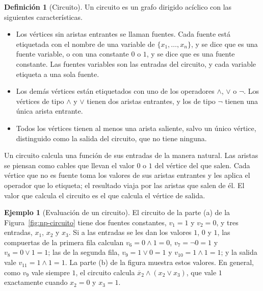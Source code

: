 \documentclass[12pt, spanish, oneside, openany]{book}
\newcommand{\nega}[1]{\overline{#1}} %
\theoremstyle{uprightplain}
\theoremstyle{definition}
\newtheorem{definicion}[teorema]{Definición}
\newtheorem{ejemplo}[teorema]{Ejemplo}
\theoremstyle{remark}
\theoremstyle{definition}
\begin{document}
\begin{definicion}[Circuito]
\label{def:np-circuito}
Un circuito es un grafo dirigido acíclico con las siguientes características.
\begin{itemize}
    \item Los vértices sin aristas entrantes se llaman fuentes. Cada fuente está etiquetada con el nombre de una variable de $\{x_1,\dots,x_n\}$, y se dice que es una fuente variable, o con una constante $0$ o $1$, y se dice que es una fuente constante. Las fuentes variables son las entradas del circuito, y cada variable etiqueta a una sola fuente.
    \item Los demás vértices están etiquetados con uno de los operadores $\wedge$, $\vee$ o $\neg$. Los vértices de tipo $\wedge$ y $\vee$ tienen dos aristas entrantes, y los de tipo $\neg$ tienen una única arista entrante.
    \item Todos los vértices tienen al menos una arista saliente, salvo un único vértice, distinguido como la salida del circuito, que no tiene ninguna.
\end{itemize}
\end{definicion}

Un circuito calcula una función de sus entradas de la manera natural. Las aristas se piensan como cables que llevan el valor $0$ o $1$ del vértice del que salen. Cada vértice que no es fuente toma los valores de sus aristas entrantes y les aplica el operador que lo etiqueta; el resultado viaja por las aristas que salen de él. El valor que calcula el circuito es el que calcula el vértice de salida.

\begin{ejemplo}[Evaluación de un circuito]
\label{ej:np-circuito}
El circuito de la parte (a) de la Figura~\ref{fig:np-circuito} tiene dos fuentes constantes, $v_1=1$ y $v_2=0$, y tres entradas, $x_1$, $x_2$ y $x_3$. Si a las entradas se les dan los valores $1$, $0$ y $1$, las compuertas de la primera fila calculan $v_6=0\wedge 1=0$, $v_7=\neg 0=1$ y $v_8=0\vee 1=1$; las de la segunda fila, $v_9=1\vee 0=1$ y $v_{10}=1\wedge 1=1$; y la salida vale $v_{11}=1\wedge 1=1$. La parte (b) de la figura muestra estos valores. En general, como $v_9$ vale siempre $1$, el circuito calcula $\nega{x}_2\wedge(x_2\vee x_3)$, que vale $1$ exactamente cuando $x_2=0$ y $x_3=1$.
\end{ejemplo}
\end{document}

